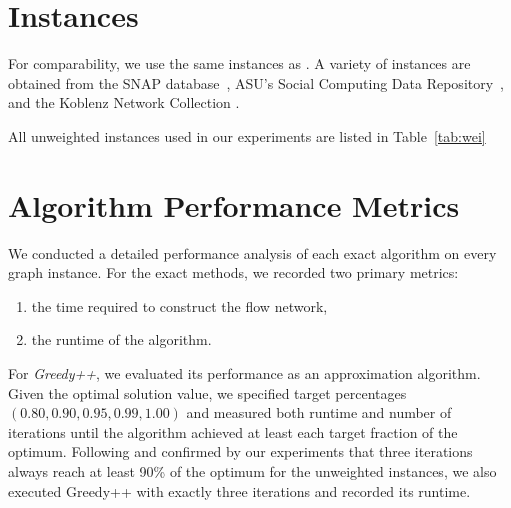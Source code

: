 \section[Instances]{Instances}\label{sec:Instances}

For comparability, we use the same instances as \textcite{noauthor_degree-mass_2026}.
A variety of instances are obtained from the SNAP database~\parencite{leskovec_snap_2014},
ASU’s Social Computing Data Repository~\parencite{zafarani_social_2009}, and the Koblenz Network Collection
\parencite{kunegis_konect_2013}.

All unweighted instances used in our experiments are listed in Table~\ref{tab:wei}
\begin{table}[h]
    \centering
    \resizebox{\textwidth}{!}{
        
    }
    \caption{Overview of instances: $n$ is the number of vertices, $m$ the number of edges, 
    Sources: [1] KONECT~\parencite{kunegis_konect_2013}, [2] Zafrani~\parencite{zafarani_social_2009}; unmarked instances are from SNAP~\parencite{leskovec_snap_2014}.    }
    \label{tab:instance_table}
\end{table}

\section[Algorithm Performance Metrics]{Algorithm Performance Metrics}
\label{sec:algorithm-performance-metrics}
We conducted a detailed performance analysis of each exact algorithm on every graph instance.
For the exact methods, we recorded two primary metrics:
\begin{enumerate}
    \item the time required to construct the flow network,
    \item the runtime of the algorithm.
\end{enumerate}

For \emph{Greedy++}, we evaluated its performance as an approximation algorithm.
Given the optimal solution value, we specified target percentages
$(0.80, 0.90, 0.95, 0.99, 1.00)$ and measured both runtime and number of iterations
until the algorithm achieved at least each target fraction of the optimum.
Following \textcite{boob_flowless_2020} and confirmed by our experiments that
three iterations always reach at least 90\% of the optimum for the unweighted instances,
we also executed Greedy++ with exactly three iterations and recorded its runtime.

